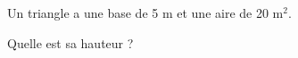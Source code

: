 \documentclass[exercice]{thedocument}%
\begin{document}
%
Un triangle a une base de 5 m et une aire de 20 m$^2$.\par\medskip
Quelle est sa hauteur ?
\answerspace{2cm}
\end{document}

